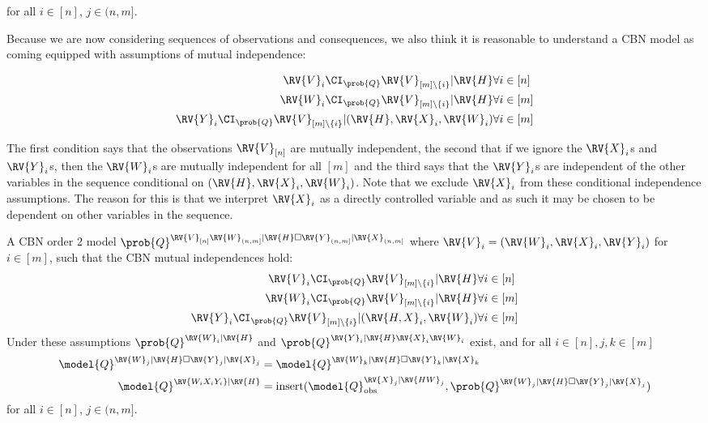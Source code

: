 for all $i\in[n]$, $j\in (n,m]$.

Because we are now considering sequences of observations and consequences, we also think it is reasonable to understand a CBN model as coming equipped with assumptions of mutual independence:

\begin{align}
    \RV{V}_i\CI_{\prob{Q}} \RV{V}_{[m]\setminus \{i\}}|\RV{H}&\forall i\in [n]\\
    \RV{W}_i\CI_{\prob{Q}} \RV{V}_{[m]\setminus \{i\}}|\RV{H}&\forall i\in [m]\\
    \RV{Y}_i\CI_{\prob{Q}} \RV{V}_{[m]\setminus \{i\}}|(\RV{H},\RV{X}_i,\RV{W}_i)&\forall i\in [m]\\
\end{align}

The first condition says that the observations $\RV{V}_{[n]}$ are mutually independent, the second that if we ignore the $\RV{X}_i$s and $\RV{Y}_i$s, then the $\RV{W}_i$s are mutually independent for all $[m]$ and the third says that the $\RV{Y}_i$s are independent of the other variables in the sequence conditional on $(\RV{H},\RV{X}_i,\RV{W}_i)$. Note that we exclude $\RV{X}_i$ from these conditional independence assumptions. The reason for this is that we interpret $\RV{X}_i$ as a directly controlled variable and as such it may be chosen to be dependent on other variables in the sequence.

\begin{definition}\label{def:cbn_o2}
A CBN order 2 model $\prob{Q}^{\RV{V}_{[n]}\RV{W}_{(n,m]}|\RV{H}\square \RV{Y}_{(n,m]}|\RV{X}_{(n,m]}}$ where $\RV{V}_{i} = (\RV{W}_i,\RV{X}_i,\RV{Y}_i)$ for $i\in [m]$, such that the CBN mutual independences hold:
\begin{align}
    \RV{V}_i\CI_{\prob{Q}} \RV{V}_{[m]\setminus \{i\}}|\RV{H}&\forall i\in [n]\label{eq:cbn_ci1}\\
    \RV{W}_i\CI_{\prob{Q}} \RV{V}_{[m]\setminus \{i\}}|\RV{H}&\forall i\in [m]\label{eq:cbn_ci2}\\
    \RV{Y}_i\CI_{\prob{Q}} \RV{V}_{[m]\setminus \{i\}}|(\RV{H,X}_i,\RV{W}_i)&\forall i\in [m]\label{eq:cbn_ci3}\\
\end{align}
Under these assumptions $\prob{Q}^{\RV{W}_i|\RV{H}}$ and $\prob{Q}^{\RV{Y}_i|\RV{H}\RV{X}_i\RV{W}_i}$ exist, and for all $i\in [n],j,k\in [m]$
\begin{align}
    \model{Q}^{\RV{W}_{j}|\RV{H}\square\RV{Y}_{j}|\RV{X}_{j}}&=\model{Q}^{\RV{W}_{k}|\RV{H}\square\RV{Y}_{k}|\RV{X}_{k}}\label{eq:identically_distributed}\\
    \model{Q}^{\RV{W_iX_iY_i}|\RV{H}} &= \text{insert}(\model{Q}_{\text{obs}}^{\RV{X}_{j}|\RV{HW}_{j}},\prob{Q}^{\RV{W}_{j}|\RV{H}\square\RV{Y}_{j}|\RV{X}_{j}})\label{eq:cbn_insert}
\end{align}
for all $i\in[n]$, $j\in (n,m]$.
\end{definition}


